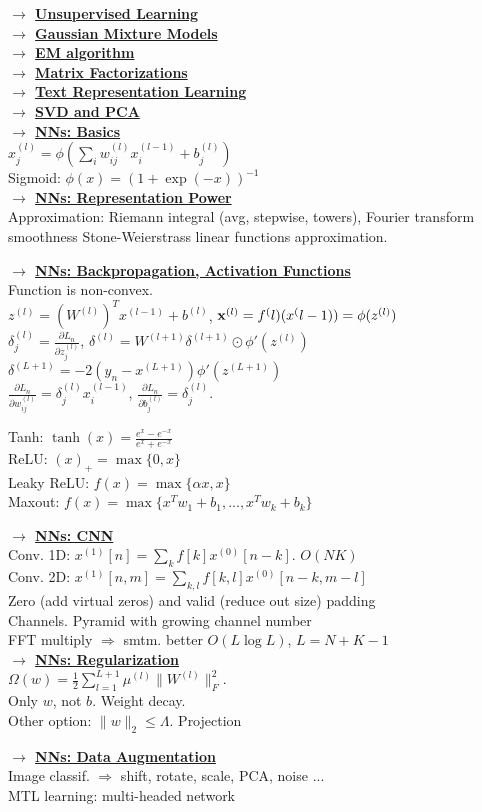 \documentclass[]{article}
\newcommand{\myvector}[1]{{\bf{#1}}}
\newcommand{\x}{\myvector{x}}
\newcommand{\mytitle}[1]{ {\bf $\rightarrow$ \underline{#1}}\\}
\begin{document}
\begin{multicols*}{2}
\mytitle{Unsupervised Learning}
\mytitle{Gaussian Mixture Models}
\mytitle{EM algorithm}
\mytitle{Matrix Factorizations}
\mytitle{Text Representation Learning}
\mytitle{SVD and PCA}
\mytitle{NNs: Basics}
$x_j^{(l)}=\phi\left(\sum\limits_iw_{ij}^{(l)}x_i^{(l-1)}+b_j^{(l)}\right)$\\
Sigmoid: $\phi(x)=(1+\exp(-x))^{-1}$\\

\mytitle{NNs: Representation Power}
Approximation: Riemann integral (avg, stepwise, towers), Fourier transform smoothness
Stone-Weierstrass linear functions approximation.

\mytitle{NNs: Backpropagation, Activation Functions}
Function is non-convex.\\
$z^({l})=(W^{(l)})^Tx^{(l-1)}+b^{(l)}$, $\x^{(l)}=f^({l})(x^({l-1}))=\phi(z^{(l)})$\\
$\delta_j^{(l)}=\frac{\partial L_n}{\partial z_j^{(l)}}$, $\delta^{(l)}=W^{(l+1)}\delta^{(l+1)}\odot \phi'(z^{(l)})$\\
$\delta^{(L+1)}=-2(y_n-x^{(L+1)})\phi'(z^{(L+1)})$\\
$\frac{\partial L_n}{\partial w_{ij}^{(l)}}=\delta^{(l)}_jx_i^{(l-1)}$,
$\frac{\partial L_n}{\partial b_{j}^{(l)}}=\delta^{(l)}_j$.

Tanh: $\tanh(x)=\frac{e^x-e^{-x}}{e^x+e^{-x}}$\\
ReLU: $(x)_+=\max\{0, x\}$\\
Leaky ReLU: $f(x)=\max\{\alpha x, x\}$\\
Maxout: $f(x)=\max\{x^Tw_1+b_1,...,x^Tw_k+b_k\}$

\mytitle{NNs: CNN}
Conv. 1D: $x^{(1)}[n]=\sum\limits_kf[k]x^{(0)}[n-k]$. $O(NK)$\\
Conv. 2D: $x^{(1)}[n,m]=\sum\limits_{k,l}f[k,l]x^{(0)}[n-k,m-l]$\\
Zero (add virtual zeros) and valid (reduce out size) padding\\
Channels. Pyramid with growing channel number\\
FFT multiply $\Rightarrow$ smtm. better $O(L\log L)$, $L=N+K-1$\\

\mytitle{NNs: Regularization}
$\Omega(w)=\frac{1}{2}\sum\limits_{l=1}^{L+1}\mu^{(l)}\|W^{(l)}\|_F^2$.\\
Only $w$, not $b$. Weight decay.\\
Other option: $\|w\|_2\leqslant \Lambda$. Projection

\mytitle{NNs: Data Augmentation}
Image classif. $\Rightarrow$ shift, rotate, scale, PCA, noise ...\\
MTL learning: multi-headed network


\end{multicols*}
\end{document}
